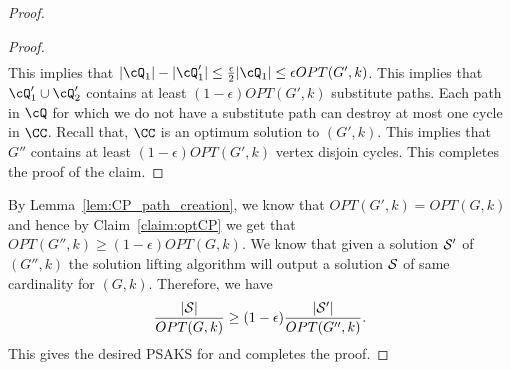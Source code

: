 \begin{proof}
\begin{proof}
\begin{eqnarray*}
\end{eqnarray*}
This implies that $\vert \cQ_1\vert-\vert \cQ_1'\vert \leq  \frac{\epsilon}{2} \vert \cQ_1 \vert \leq \epsilon OPT(G',k)$. This implies that  $\cQ_1'\cup \cQ_2'$ contains at least $(1-\epsilon)OPT(G',k)$ substitute paths. Each path in $\cQ$ for which we do not have a substitute path can destroy at most one cycle in 
$\CC$. Recall that, $\CC$  is an optimum solution to $(G',k)$. This implies that $G''$
contains at least $(1-\epsilon)OPT(G',k)$ vertex disjoin cycles. 
This completes the proof of the claim. 
\end{proof}
By Lemma~\ref{lem:CP_path_creation}, we know that $OPT(G',k)=OPT(G,k)$ and hence 
by Claim~\ref{claim:optCP} we get that $OPT(G'',k)\geq (1-\epsilon)OPT(G,k)$.   
We know that given a solution ${\cal S}'$ of $(G'',k)$ the solution lifting algorithm will output a solution ${\cal S}$ of same cardinality
for $(G,k)$. Therefore, we have  
$$\frac{\vert{\cal S}\vert}{OPT(G,k)}\geq (1-\epsilon) \frac{\vert{\cal S}'\vert}{OPT(G'',k)}.$$
This gives the desired PSAKS for \CP{} and completes the proof.
\end{proof}


